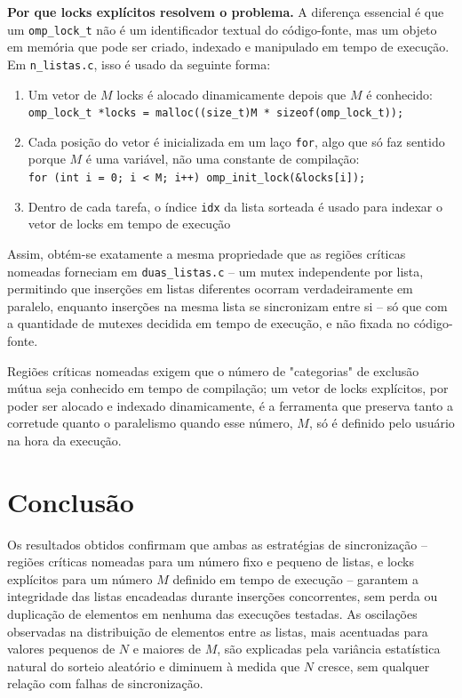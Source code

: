 \documentclass[a4paper,12pt]{article}
\begin{document}
\textbf{Por que locks explícitos resolvem o problema.} A diferença essencial 
é que um \texttt{omp\_lock\_t} não é um identificador textual do código-fonte, 
mas um objeto em memória que pode ser criado, indexado e manipulado em tempo de 
execução. Em \texttt{n\_listas.c}, isso é usado da seguinte forma:

\begin{enumerate}
    \item Um vetor de $M$ locks é alocado dinamicamente depois que $M$ é conhecido: \\
    \texttt{omp\_lock\_t *locks = malloc((size\_t)M * sizeof(omp\_lock\_t));}
    \item Cada posição do vetor é inicializada em um laço \texttt{for}, algo que só faz sentido porque $M$ é uma variável, não uma constante de compilação:\\
    \texttt{for (int i = 0; i < M; i++) omp\_init\_lock(\&locks[i]);}
    \item Dentro de cada tarefa, o índice \texttt{idx} da lista sorteada é usado para indexar o vetor de locks em tempo de execução
\end{enumerate}

Assim, obtém-se exatamente a mesma propriedade que as regiões críticas nomeadas 
forneciam em \texttt{duas\_listas.c} -- um mutex 
independente por lista, permitindo que inserções em listas diferentes 
ocorram verdadeiramente em paralelo, enquanto inserções na mesma lista se sincronizam 
entre si -- só que com a quantidade de mutexes decidida em tempo de execução, e não 
fixada no código-fonte. 

Regiões críticas nomeadas exigem que o número de "categorias" de 
exclusão mútua seja conhecido em tempo de compilação; um vetor de 
locks explícitos, por poder ser alocado e indexado dinamicamente, 
é a ferramenta que preserva tanto a corretude quanto o paralelismo 
quando esse número, $M$, só é definido pelo usuário na hora da execução.

\section{Conclusão}

Os resultados obtidos confirmam que ambas as estratégias de sincronização -- regiões críticas nomeadas para um número fixo e pequeno de listas, e locks explícitos para um número $M$ definido em tempo de execução -- garantem a integridade das listas encadeadas durante inserções concorrentes, sem perda ou duplicação de elementos em nenhuma das execuções testadas. As oscilações observadas na distribuição de elementos entre as listas, mais acentuadas para valores pequenos de $N$ e maiores de $M$, são explicadas pela variância estatística natural do sorteio aleatório e diminuem à medida que $N$ cresce, sem qualquer relação com falhas de sincronização.
\end{document}
